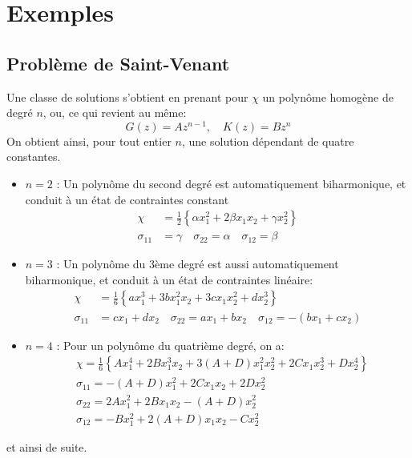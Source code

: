 \section{Exemples}\label{sec:Ch08-2}
\subsection{Problème de Saint-Venant}\label{ssec:Ch08-2.1}
Une classe de solutions s'obtient en prenant pour $\chi$ un polynôme homogène de degré $n$, ou, ce qui revient au même: 
\begin{equation}
  G(z)=Az^{n-1},\quad K(z)=Bz^{n}
    \label{eq:Ch08-036}
\end{equation}
On obtient ainsi, pour tout entier $n$, une solution dépendant de quatre constantes.
\begin{itemize}
\item $n=2$ : Un polynôme du second degré est automatiquement biharmonique, et conduit à un état de contraintes constant 
\begin{equation}
  \begin{aligned}
    \chi        & = \frac{1}{2}\left\{\alpha x_1^2 + 2 \beta x_1 x_2 + \gamma x_2^2\right\} \\
    \sigma_{11} & = \gamma \quad \sigma_{22} = \alpha \quad \sigma_{12} = \beta
  \end{aligned}
    \label{eq:Ch08-037}
\end{equation}
\item $n=3$ : Un polynôme du 3ème degré est aussi automatiquement biharmonique, et conduit à un état de contraintes linéaire: 
\begin{equation}
  \begin{aligned}
    \chi        & = \frac{1}{6}\left\{a x_1^3 + 3 b x_1^2 x_2 + 3 c x_1 x_2^2 + d x_2^3\right\} \\
    \sigma_{11} & = c x_1 + d x_2 \quad \sigma_{22} = a x_1 + b x_2 \quad \sigma_{12} = -(b x_1 + c x_2)
  \end{aligned}
    \label{eq:Ch08-038}
\end{equation}
\item $n=4$ : Pour un polynôme du quatrième degré, on a: 
\begin{equation}
\begin{aligned}
&\chi = \frac{1}{6}\left\{A x_1^4 + 2 B x_1^3 x_2 + 3 (A+D) x_1^2x_2^2 + 2 C x_1 x_2^3 + D x_2^4\right\} \\
&\sigma_{11}  = -(A+D) x_1^2 +    2 C x_1 x_2 +   2 D x_2^2 \\
&\sigma_{22}  =    2 A x_1^2 +    2 B x_1 x_2 - (A+D) x_2^2 \\
&\sigma_{12}  =     -B x_1^2 + 2(A+D) x_1 x_2 -     C x_2^2 
\end{aligned}
\label{eq:Ch08-039}
\end{equation}
\end{itemize}
et ainsi de suite. 

